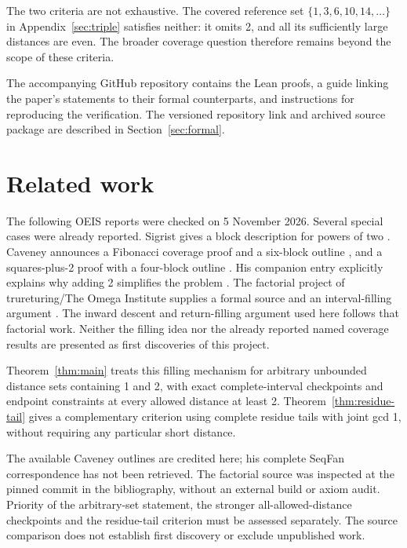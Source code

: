 \documentclass[11pt,a4paper]{article}
\begin{document}
The two criteria are not exhaustive. The covered reference set
$\{1,3,6,10,14,\ldots\}$ in Appendix~\ref{sec:triple} satisfies neither:
it omits 2, and all its sufficiently large distances are even. The broader
coverage question therefore remains beyond the scope of these criteria.

The accompanying GitHub repository contains the Lean proofs, a guide linking
the paper's statements to their formal counterparts, and instructions for
reproducing the verification. The versioned repository link and archived
source package \cite{package} are described in Section~\ref{sec:formal}.

\section{Related work}\label{sec:context}
The following OEIS reports were checked on 5 November 2026.
Several special cases were already reported. Sigrist gives a block
description for powers of two \cite{powers}. Caveney announces a Fibonacci
coverage proof and a six-block outline \cite{fibonacci}, and a
squares-plus-2 proof with a four-block outline \cite{squares2}.
His companion entry explicitly explains why adding 2 simplifies the
problem \cite{adding2}. The factorial project of trureturing/The Omega
Institute supplies a formal source and an interval-filling argument
\cite{factorial,factorialcode}. The inward descent and return-filling argument used here follows that
factorial work.
Neither the filling idea nor the already reported named coverage results
are presented as first discoveries of this project.

Theorem~\ref{thm:main} treats this filling mechanism for arbitrary unbounded
distance sets containing 1 and 2, with exact complete-interval checkpoints
and endpoint constraints at every allowed distance at least 2.
Theorem~\ref{thm:residue-tail} gives a complementary criterion using complete
residue tails with joint gcd 1, without requiring any particular short distance.

The available Caveney outlines are credited here; his complete SeqFan
correspondence has not been retrieved. The factorial source was inspected
at the pinned commit in the bibliography, without an external build or
axiom audit. Priority of the arbitrary-set statement, the stronger
all-allowed-distance checkpoints and the residue-tail criterion must be
assessed separately. The source comparison does not establish first
discovery or exclude unpublished work.
\end{document}
